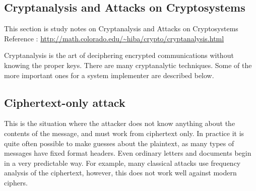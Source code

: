 \documentclass[12pt]{article}
\begin{document}
\maketitle
\pagebreak
\tableofcontents





%
%
\pagebreak
\vspace*{\fill}
\begin{center}
\section{Cryptanalysis and Attacks on Cryptosystems }
This section is study notes on Cryptanalysis and Attacks on Cryptosystems 
Reference : 	\url {http://math.colorado.edu/~hiba/crypto/cryptanalysis.html}
\end{center}
\vspace*{\fill}
\pagebreak

Cryptanalysis is the art of deciphering encrypted communications without knowing the proper keys. There are many cryptanalytic techniques. Some of the more important ones for a system implementer are described below.

\subsection{Ciphertext-only attack}
This is the situation where the attacker does not know anything about the contents of the message, and must work from ciphertext only. In practice it is quite often possible to make guesses about the plaintext, as many types of messages have fixed format headers. Even ordinary letters and documents begin in a very predictable way. For example, many classical attacks use frequency analysis of the ciphertext, however, this does not work well against modern ciphers.
\end{document}
